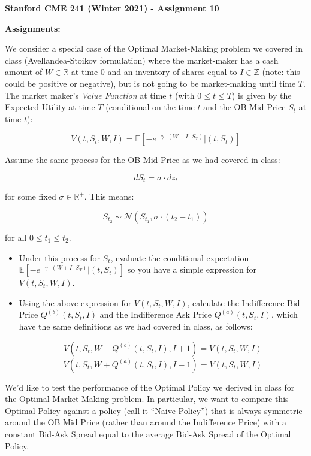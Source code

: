 \documentclass[12pt]{exam}
\begin{document}
\begin{center}
{\large {\bf Stanford CME 241 (Winter 2021) - Assignment 10}}
\end{center}
 
{\large{\bf Assignments:}}
\begin{questions}
\question We consider a special case of the Optimal Market-Making problem we covered in class (Avellandea-Stoikov formulation) where the market-maker has a cash amount of $W \in \mathbb{R}$ at time 0 and an inventory of shares equal to $I \in \mathbb{Z}$ (note: this could be positive or negative), but is not going to be market-making until time $T$. The market maker's {\em Value Function} at time $t$ (with $0 \leq t \leq T$) is given by the Expected Utility at time $T$ (conditional on the time $t$ and the OB Mid Price $S_t$ at time $t$):

$$V(t, S_t, W, I) = \mathbb{E}[-e^{-\gamma \cdot (W + I \cdot S_T)} | (t, S_t)]$$

Assume the same process for the OB Mid Price as we had covered in class:

$$dS_t = \sigma \cdot dz_t$$

for some fixed $\sigma \in \mathbb{R}^+$. This means:

$$S_{t_2} \sim \mathcal{N}(S_{t_1}, \sigma \cdot (t_2 - t_1))$$

for all $0 \leq t_1 \leq t_2$.

\begin{itemize}
\item Under this process for $S_t$, evaluate the conditional expectation $\mathbb{E}[-e^{-\gamma \cdot (W + I \cdot S_T)} | (t, S_t)]$ so you have a simple expression for $V(t, S_t, W, I)$.
\item Using the above expression for $V(t, S_t, W, I)$, calculate the Indifference Bid Price $Q^{(b)}(t, S_t, I)$ and the Indifference Ask Price $Q^{(a)}(t,S_t,I)$, which have the same definitions as we had covered in class, as follows:

$$V(t,S_t,W - Q^{(b)}(t, S_t, I), I + 1) = V(t,S_t,W, I)$$
$$V(t,S_t,W + Q^{(a)}(t, S_t, I), I - 1) = V(t,S_t,W, I)$$
\end{itemize}

\question We'd like to test the performance of the Optimal Policy we derived in class for the Optimal Market-Making problem. In particular, we want to compare this Optimal Policy against a policy (call it ``Naive Policy'') that is always symmetric around the OB Mid Price (rather than around the Indifference Price) with a constant Bid-Ask Spread equal to the average Bid-Ask Spread of the Optimal Policy.


\end{questions}
\end{document}
